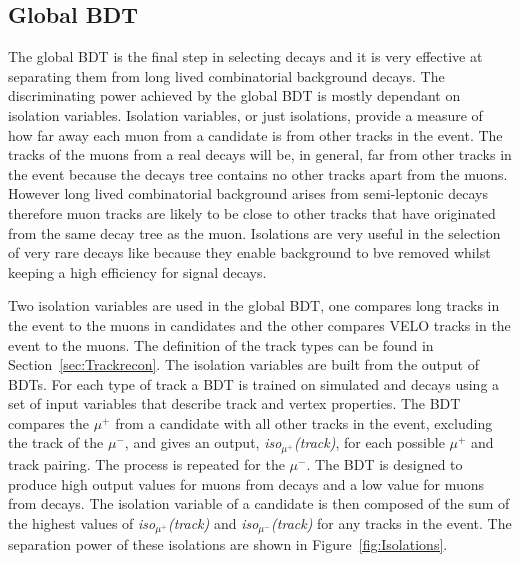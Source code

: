 \subsection{Global BDT}
\label{sec:globalBDT}

The global BDT is the final step in selecting \bsmumu decays and it is very effective at separating them from long lived combinatorial background decays. The discriminating power achieved by the global BDT is mostly dependant on isolation variables. Isolation variables, or just isolations, provide a measure of how far away each muon from a \bsmumu candidate is from other tracks in the event. The tracks of the muons from a real \bsmumu decays will be, in general, far from other tracks in the event because the \bsmumu decays tree contains no other tracks apart from the muons. However long lived combinatorial background arises from semi-leptonic decays therefore muon tracks are likely to be close to other tracks that have originated from the same decay tree as the muon. %
Isolations are very useful in the selection of very rare decays like \bsmumu because they enable background to bve removed whilst keeping a high efficiency for signal decays.

Two isolation variables are used in the global BDT, one compares long tracks in the event to the muons in \bsmumu candidates and the other compares VELO tracks in the event to the muons. The definition of the track types can be found in Section~\ref{sec:Trackrecon}. The isolation variables are built from the output of BDTs. For each type of track a BDT is trained on simulated \bsmumu and \bbbarmumux decays using a set of input variables that describe track and vertex properties. The BDT compares the $\mu^{+}$ from a \bsmumu candidate with all other tracks in the event, excluding the track of the $\mu^{-}$, and gives an output, {\it iso$_{\mu^{+}}$(track)}, for each possible $\mu^{+}$ and track pairing. The process is repeated for the $\mu^{-}$. The BDT is designed to produce high output values for muons from \bbbarmumux decays and a low value for muons from \bsmumu decays. The isolation variable of a \bsmumu candidate is then composed of the sum of the highest values of {\it iso$_{\mu^{+}}$(track)} and {\it iso$_{\mu^{-}}$(track)} for any tracks in the event. The separation power of these isolations are shown in Figure~\ref{fig:Isolations}. %

